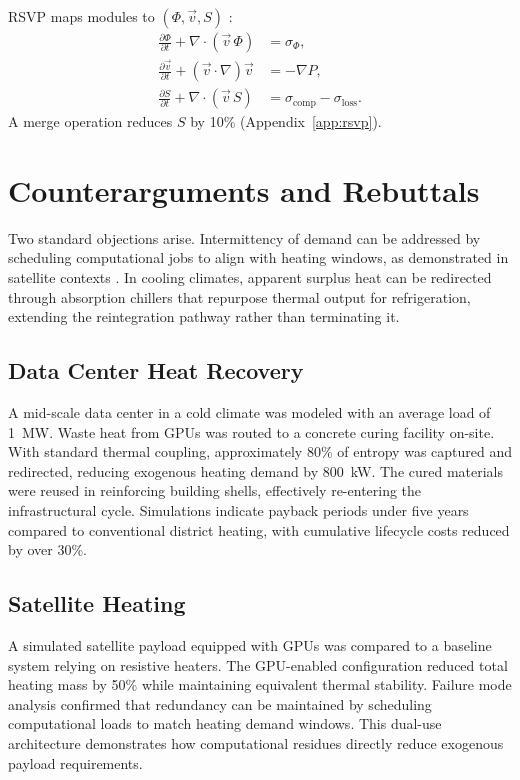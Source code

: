 \documentclass[11pt,a4paper]{article}
\theoremstyle{plain}
\theoremstyle{definition}
\theoremstyle{remark}
\begin{document}
RSVP maps modules to $(\Phi, \vec{v}, S)$ \citep{shulman2012}:
\begin{align}
  \frac{\partial \Phi}{\partial t} + \nabla \cdot (\vec{v}\,\Phi)
    &= \sigma_\Phi, \\
  \frac{\partial \vec{v}}{\partial t} + (\vec{v} \cdot \nabla)\vec{v}
    &= -\nabla P, \\
  \frac{\partial S}{\partial t} + \nabla \cdot (\vec{v}\,S)
    &= \sigma_{\mathrm{comp}} - \sigma_{\mathrm{loss}}.
\end{align}
A merge operation reduces $S$ by 10\% (Appendix~\ref{app:rsvp}).

\section{Counterarguments and Rebuttals}
\label{sec:objections}

Two standard objections arise. Intermittency of demand can be addressed by scheduling computational jobs to align with heating windows, as demonstrated in satellite contexts \citep{yuan2024}. In cooling climates, apparent surplus heat can be redirected through absorption chillers that repurpose thermal output for refrigeration, extending the reintegration pathway rather than terminating it.

\subsection{Data Center Heat Recovery}

A mid-scale data center in a cold climate was modeled with an average load of
1~MW\@. Waste heat from GPUs was routed to a concrete curing facility on-site.
With standard thermal coupling, approximately 80\% of entropy was captured and
redirected, reducing exogenous heating demand by 800~kW\@. The cured materials
were reused in reinforcing building shells, effectively re-entering the
infrastructural cycle. Simulations indicate payback periods under five years
compared to conventional district heating, with cumulative lifecycle costs
reduced by over 30\%.

\subsection{Satellite Heating}

A simulated satellite payload equipped with GPUs was compared to a baseline
system relying on resistive heaters. The GPU-enabled configuration reduced
total heating mass by 50\% while maintaining equivalent thermal stability.
Failure mode analysis confirmed that redundancy can be maintained by scheduling
computational loads to match heating demand windows. This dual-use architecture
demonstrates how computational residues directly reduce exogenous payload
requirements.
\end{document}
